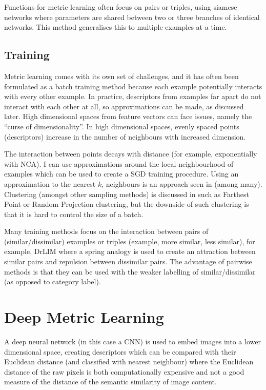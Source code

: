 Functions for metric learning often focus on pairs or triples, using siamese networks where parameters are shared between two or three branches of identical networks. This method generalises this to multiple examples at a time.

\subsection {Training}

Metric learning comes with its own set of challenges, and it has often been formulated as a batch training method because each example potentially interacts with every other example. In practice, descriptors from examples far apart do not interact with each other at all, so approximations can be made, as discussed later. High dimensional spaces from feature vectors can face issues, namely the ``curse of dimensionality''. In high dimensional spaces, evenly spaced points (descriptors) increase in the number of neighbours with increased dimension. 

The interaction between points decays with distance (for example, exponentially with \gls{NCA}). I can use approximations around the local neighbourhood of examples which can be used to create a \gls{SGD} training procedure. Using an approximation to the nearest $ k $, neighbours is an approach seen in \cite{Mensink2012,Zaidi2011} (among many). Clustering (amongst other sampling methods) is discussed in  \cite{Oneat2011} such as Farthest Point or Random Projection clustering, but the downside of such clustering is that it is hard to control the size of a batch. 

Many training methods focus on the interaction between pairs of (similar/dissimilar) examples or triples (example, more similar, less similar), for example, DrLIM \cite{Hadsell2006} where a spring analogy is used to create an attraction between similar pairs and repulsion between dissimilar pairs. The advantage of pairwise methods is that they can be used with the weaker labelling of similar/dissimilar (as opposed to category label).

\section {Deep Metric Learning}

A deep neural network (in this case a \gls{CNN}) is used to embed images into a lower dimensional space, creating descriptors which can be compared with their Euclidean distance (and classified with nearest neighbour) where the Euclidean distance of the raw pixels is both computationally expensive and not a good measure of the distance of the semantic similarity of image content. 

